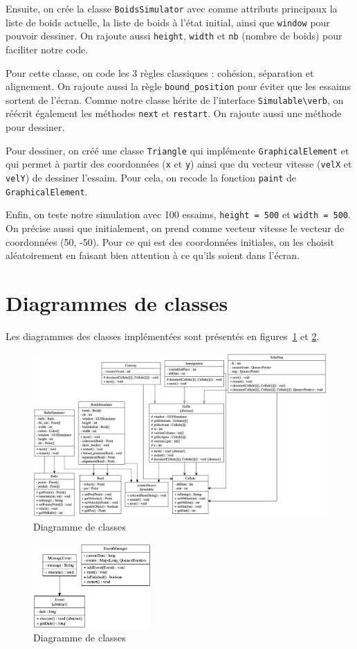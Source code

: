 \documentclass[a4paper, 11pt, french]{article}
\begin{document}
Ensuite, on crée la classe \verb|BoidsSimulator| avec comme attributs principaux la liste de boids actuelle, la liste de boids à l'état initial, ainsi que \verb|window| pour pouvoir dessiner. On rajoute aussi \verb|height|, \verb|width| et \verb|nb| (nombre de boids) pour faciliter notre code. 

Pour cette classe, on code les 3 règles classiques : cohésion, séparation et alignement. On rajoute aussi la règle \verb|bound_position| pour éviter que les essaims sortent de l'écran. Comme notre classe hérite de l'interface \verb|Simulable\verb|, on réécrit également les méthodes \verb|next| et \verb|restart|. On rajoute aussi une méthode pour dessiner.

Pour dessiner, on créé une classe \verb|Triangle| qui implémente \verb|GraphicalElement| et qui permet à partir des coordonnées (\verb|x| et \verb|y|) ainsi que du vecteur vitesse (\verb|velX| et \verb|velY|) de dessiner l'essaim. Pour cela, on recode la fonction \verb|paint| de \verb|GraphicalElement|.

Enfin, on teste notre simulation avec 100 essaims, \verb|height = 500| et \verb|width = 500|. On précise aussi que initialement, on prend comme vecteur vitesse le vecteur de coordonnées (50, -50). Pour ce qui est des coordonnées initiales, on les choisit aléatoirement en faisant bien attention à ce qu'ils soient dans l'écran.

\section{Diagrammes de classes}

Les diagrammes des classes implémentées sont présentés en figures~\ref{fig:graph1} et \ref{fig:graph2}.

\begin{figure}[H]
    \centering
    \includegraphics[width=\textwidth]{graph1.png}
    \caption{Diagramme de classes}
    \label{fig:graph1}
\end{figure}

\begin{figure}[H]
    \centering
    \includegraphics[width=0.4\textwidth]{graph2.png}
    \caption{Diagramme de classes}
    \label{fig:graph2}
\end{figure}
\end{document}
